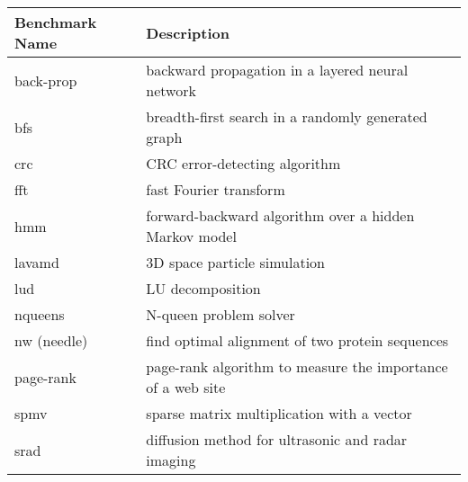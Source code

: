 \begin{tabular}{|l|l|}
    \hline
    \textbf{Benchmark Name} & \textbf{Description}                                        \\ \hline
    back-prop               & backward propagation in a layered neural network            \\ \hline
    bfs                     & breadth-first search in a randomly generated graph          \\ \hline
    crc                     & CRC error-detecting algorithm                               \\ \hline
    fft                     & fast Fourier transform                                      \\ \hline
    hmm                     & forward-backward algorithm over a hidden Markov model       \\ \hline
    lavamd                  & 3D space particle simulation                                \\ \hline
    lud                     & LU decomposition                                            \\ \hline
    nqueens                 & N-queen problem solver                                      \\ \hline
    nw (needle)             & find optimal alignment of two protein sequences             \\ \hline
    page-rank               & page-rank algorithm to measure the importance of a web site \\ \hline
    spmv                    & sparse matrix multiplication with a vector                  \\ \hline
    srad                    & diffusion method for ultrasonic and radar imaging           \\ \hline
\end{tabular}
